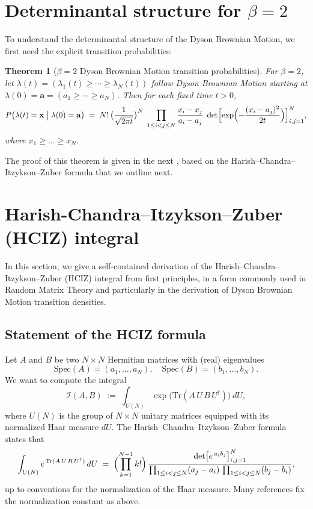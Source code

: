 \documentclass[letterpaper,11pt,oneside,reqno]{book}
\numberwithin{equation}{chapter}  %
\newtheorem{theorem}[proposition]{Theorem}
\theoremstyle{definition}
\begin{document}
\section{Determinantal structure for \texorpdfstring{\(\beta=2\)}{beta=2}}

To understand the determinantal structure of the Dyson Brownian Motion, we
first need the explicit transition probabilities:

\begin{theorem}[\(\beta=2\) Dyson Brownian Motion transition probabilities]
	\label{lecture10:thm:dbm-transition}
For \(\beta=2\), let \(\lambda(t)=(\lambda_1(t)\ge \cdots \ge \lambda_N(t))\) follow Dyson Brownian Motion starting at \(\lambda(0)=\mathbf{a}=(a_1\ge \cdots \ge a_N)\).  Then for each fixed time \(t>0\),
\[
P\bigl(\lambda(t) = \mathbf{x}\;\big|\;\lambda(0)=\mathbf{a}\bigr)
\;=\;
N!\,\bigl(\frac{1}{\sqrt{2\pi t}}\bigr)^{N}
\;\prod_{1\le i<j\le N}\frac{x_i - x_j}{a_i - a_j}
\;\det\Bigl[\exp\Bigl(-\frac{(x_i - a_j)^2}{2t}\Bigr)\Bigr]_{i,j=1}^N,
\]
where \(x_1 \ge \dots \ge x_N\).
\end{theorem}

The proof of this theorem is given in the next
,
based on the Harish--Chandra--Itzykson--Zuber formula that we
outline next.


\section{Harish-Chandra--Itzykson--Zuber (HCIZ) integral}

In this section, we give a self-contained derivation of the Harish--Chandra--Itzykson--Zuber (HCIZ) integral from first principles, in a form commonly used in Random Matrix Theory and particularly in the derivation of Dyson Brownian Motion transition densities.

\subsection{Statement of the HCIZ formula}

Let \(A\) and \(B\) be two \(N\times N\) Hermitian matrices with (real) eigenvalues
\[
   \mathrm{Spec}(A) = (a_1,\dots,a_N),
   \quad
   \mathrm{Spec}(B) = (b_1,\dots,b_N).
\]
We want to compute the integral
\[
   \mathcal{I}(A,B)
   \;:=\;
   \int_{U(N)}
   \exp\bigl(\mathrm{Tr}(A\,U\,B\,U^\dagger)\bigr)
   \,dU,
\]
where \(U(N)\) is the group of \(N\times N\) unitary matrices equipped with its normalized Haar measure \(dU\).
The Harish--Chandra--Itzykson--Zuber formula states that
\[
   \int_{U(N)}
   e^{\,\mathrm{Tr}(A\,U\,B\,U^\dagger)}
   \,dU
   \;=\;
   \Bigl(\prod_{k=1}^{N-1} k!\Bigr)\,
   \frac{\det\bigl[e^{\,a_i b_j}\bigr]_{i,j=1}^N}{\prod_{1\le i<j\le N}(a_j-a_i)\,\prod_{1\le i<j\le N}(b_j-b_i)},
\]
up to conventions for the normalization of the Haar measure. Many references fix
the normalization constant
as above.
\end{document}
